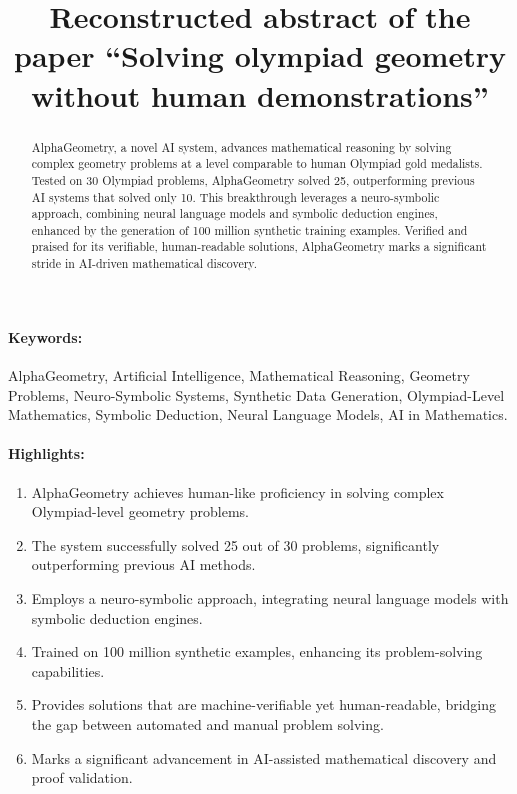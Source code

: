 \documentclass[12pt]{article}
\title{Reconstructed abstract of the paper ``Solving olympiad geometry without human demonstrations''}
\date{}
\begin{document}
\maketitle

\begin{abstract}
AlphaGeometry, a novel AI system, advances mathematical reasoning by solving complex geometry problems at a level comparable to human Olympiad gold medalists. Tested on 30 Olympiad problems, AlphaGeometry solved 25, outperforming previous AI systems that solved only 10. This breakthrough leverages a neuro-symbolic approach, combining neural language models and symbolic deduction engines, enhanced by the generation of 100 million synthetic training examples. Verified and praised for its verifiable, human-readable solutions, AlphaGeometry marks a significant stride in AI-driven mathematical discovery.
\end{abstract}
\paragraph{Keywords:} AlphaGeometry, Artificial Intelligence, Mathematical Reasoning, Geometry Problems, Neuro-Symbolic Systems, Synthetic Data Generation, Olympiad-Level Mathematics, Symbolic Deduction, Neural Language Models, AI in Mathematics.

\paragraph{Highlights:}
\begin{enumerate}
\item AlphaGeometry achieves human-like proficiency in solving complex Olympiad-level geometry problems.
\item The system successfully solved 25 out of 30 problems, significantly outperforming previous AI methods.
\item Employs a neuro-symbolic approach, integrating neural language models with symbolic deduction engines.
\item Trained on 100 million synthetic examples, enhancing its problem-solving capabilities.
\item Provides solutions that are machine-verifiable yet human-readable, bridging the gap between automated and manual problem solving.
\item Marks a significant advancement in AI-assisted mathematical discovery and proof validation.
\end{enumerate}
\end{document}
